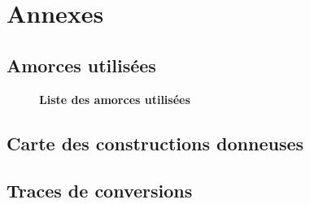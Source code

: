 \newpage
{}
\setcounter{page}{1}

\begin{multicols}{2}
\rmfamily
\footnotesize

\end{multicols}

\newpage

\setcounter{section}{0}
\section{Annexes}
\setcounter{subsection}{1}


\subsection{Amorces utilisées}
\label{subsec:amorces}

\begin{figure}[h]

\caption[Liste des amorces utilisées]{\label{img:amorces}\textbf{Liste des
    amorces utilisées}}
\end{figure}

\subsection{Carte des constructions donneuses}
\label{subsec:cartes-plasmides}


\vfill

\subsection{Traces de conversions}
\label{sec:trac-de-conv}

